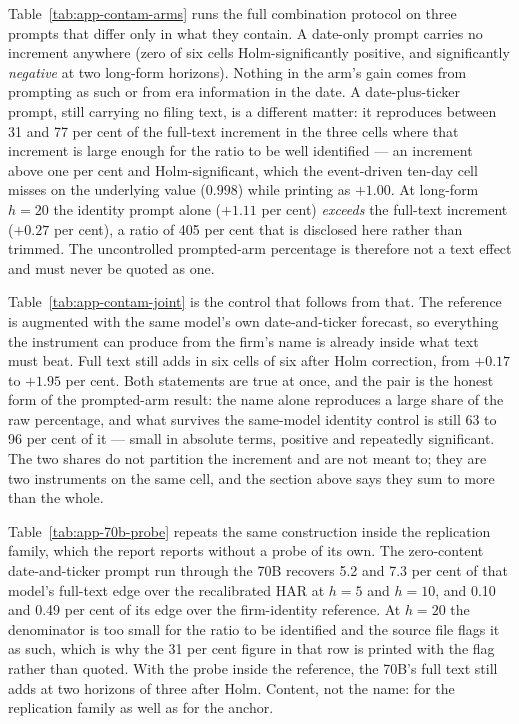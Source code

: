 Table~\ref{tab:app-contam-arms} runs the full combination protocol on three
prompts that differ only in what they contain. A date-only prompt carries
no increment anywhere (zero of six cells Holm-significantly positive,
and significantly \emph{negative} at two long-form horizons). Nothing
in the arm's gain comes from prompting as such or from era information in
the date. A date-plus-ticker prompt, still carrying no filing text, is a
different matter: it reproduces between 31 and 77 per cent of the
full-text increment in the three cells where that increment is large enough
for the ratio to be well identified --- an increment above one per cent and
Holm-significant, which the event-driven ten-day cell misses on the underlying
value ($0.998$) while printing as $+1.00$.
At long-form $h{=}20$ the identity
prompt alone ($+1.11$ per cent) \emph{exceeds} the full-text increment
($+0.27$ per cent), a ratio of 405 per cent that is disclosed here rather
than trimmed. The uncontrolled prompted-arm percentage is therefore not a
text effect and must never be quoted as one.

Table~\ref{tab:app-contam-joint} is the control that follows from that. The
reference is augmented with the same model's own date-and-ticker forecast,
so everything the instrument can produce from the firm's name is already
inside what text must beat. Full text still adds in six cells of six after
Holm correction, from $+0.17$ to $+1.95$ per cent. Both statements are
true at once, and the pair is the honest form of the prompted-arm result: the
name alone reproduces a large share of the raw percentage, and what survives
the same-model identity control is still 63 to 96 per cent of it --- small in
absolute terms, positive and repeatedly significant. The two shares do not
partition the increment and are not meant to; they are two instruments on the
same cell, and the section above says they sum to more than the whole. %

Table~\ref{tab:app-70b-probe} repeats the same construction inside the
replication family, which the report reports without a probe of its own.
The zero-content date-and-ticker prompt run through the 70B recovers 5.2
and 7.3 per cent of that model's full-text edge over the recalibrated HAR
at $h{=}5$ and $h{=}10$, and 0.10 and 0.49 per cent of its edge over the
firm-identity reference. At $h{=}20$ the denominator is too small for the
ratio to be identified and the source file flags it as such, which is why
the 31 per cent figure in that row is printed with the flag rather than
quoted. With the probe inside the reference, the 70B's full text still adds
at two horizons of three after Holm. Content, not the name: for the
replication family as well as for the anchor.

